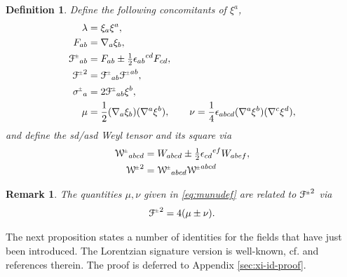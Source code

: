 \documentclass[a4paper,10pt,reqno]{amsart}
\theoremstyle{plain}
\newtheorem{definition}[thm]{Definition}
\newtheorem{remark}[thm]{Remark}
\newcommand{\PM}[1]{{{#1}^{\hspace{-.5pt}\scaleto{\pm}{3.5pt}}}}
\def\Wcal{\mathcal{W}}
\def\Fcal{\mathcal{F}}
\numberwithin{equation}{section}
\begin{document}
\begin{definition}
Define the following concomitants of $\xi^{a}$,
\begin{subequations} \label{eq:concomitatns} 
\begin{align}
\lambda  ={}& \xi_{a} \xi^{a}, \label{def:lambda} \\
F_{ab}={}&\nabla_{a}\xi_{b}, \label{def:F_ab} \\
\PM{\Fcal}_{ab}={}&F_{ab} \pm \tfrac{1}{2} \epsilon_{ab}{}^{cd} F_{cd}, \label{def:Fcal_ab}\\
\PM{\Fcal}^2={}&\PM{\Fcal}_{ab} \PM{\Fcal}^{ab}, \label{def:Fcal2} \\
\PM{\sigma}_{a}={}&2 \PM{\Fcal}_{ab} \xi^{b}, \label{def:sigmaa} \\
\mu ={}& \frac{1}{2}(\nabla_a\xi_b)(\nabla^a\xi^b), \qquad
\nu = \frac{1}{4}\epsilon_{abcd}(\nabla^a\xi^b)(\nabla^c\xi^d), \label{eq:munudef}
\end{align}
\end{subequations}
and define the sd/asd Weyl tensor and its square via
\begin{align}
\PM{\Wcal}_{abcd} ={}& W_{abcd} \pm \tfrac{1}{2} \epsilon_{cd}{}^{ef} W_{abef}, \\
 \PM{\Wcal}^2 ={}& \PM{\Wcal}_{abcd}\PM{\Wcal}^{abcd} 
\end{align}
\end{definition} 
\begin{remark} 
The quantities $\mu, \nu$ given in \eqref{eq:munudef} are related to $\PM{\Fcal}^2$ via 
\begin{align}\label{eq:F2munu}
\PM{\Fcal}^2 = 4(\mu \pm \nu).
\end{align}
\end{remark} 

The next proposition states a number of identities for the fields that have just been introduced. The Lorentzian signature version  is well-known, cf.  \cite{Mars:2000:MR1779516} and references therein. The proof is deferred to Appendix \ref{sec:xi-id-proof}.
\end{document}
